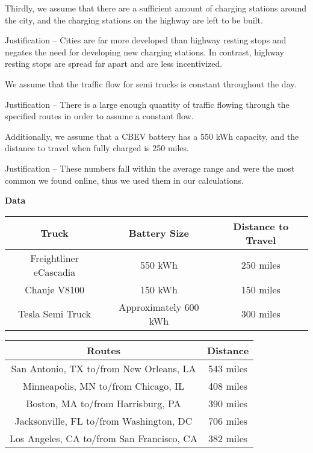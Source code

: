 \begin{assumption}
Thirdly, we assume that there are a sufficient amount of charging stations around the city, and the charging stations on the highway are left to be built.

Justification – Cities are far more developed than highway resting stops and negates the need for developing new charging stations. In contrast, highway resting stops are spread far apart and are less incentivized.
\end{assumption}

\begin{assumption}
We assume that the traffic flow for semi trucks is constant throughout the day.

Justification – There is a large enough quantity of traffic flowing through the specified routes in order to assume a constant flow.
\end{assumption}

\begin{assumption}
Additionally, we assume that a CBEV battery has a 550 kWh capacity, and the distance to travel when fully charged is 250 miles.

Justification – These numbers fall within the average range and were the most common we found online, thus we used them in our calculations.
\end{assumption}

\noindent
\textbf{Data}
\begin{center}
	\begin{tabular}{|c|c|c|}
		\hline
		\textbf{Truck} & \textbf{Battery Size} & \textbf{Distance to Travel}\\
		\hline
		Freightliner eCascadia & 550 kWh & 250 miles\\
		\hline
		Chanje V8100 & 150 kWh & 150 miles\\
		\hline
		Tesla Semi Truck & Approximately 600 kWh & 300 miles\\
		\hline
	\end{tabular}
\end{center}
\medskip
\begin{center}
	\begin{tabular}{|c|c|}
		\hline \textbf{Routes} & \textbf{Distance}\\
		\hline San Antonio, TX to/from New Orleans, LA & 543 miles\\
		\hline Minneapolis, MN to/from Chicago, IL & 408 miles\\
		\hline Boston, MA to/from Harrisburg, PA & 390 miles\\
		\hline Jacksonville, FL to/from Washington, DC & 706 miles\\
		\hline Los Angeles, CA to/from San Francisco, CA & 382 miles\\
		\hline
	\end{tabular}
\end{center}

